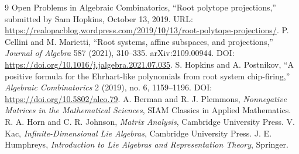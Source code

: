 \documentclass[11pt]{book}
\theoremstyle{definition}
\begin{document}
\backmatter
\begin{thebibliography}{9}
 Open Problems in Algebraic Combinatorics, ``Root polytope projections,'' submitted by Sam Hopkins, October 13, 2019. URL: \url{https://realopacblog.wordpress.com/2019/10/13/root-polytope-projections/}.
 P. Cellini and M. Marietti, ``Root systems, affine subspaces, and projections,'' \emph{Journal of Algebra} 587 (2021), 310--335. arXiv:2109.00944. DOI: \url{https://doi.org/10.1016/j.jalgebra.2021.07.035}.
 S. Hopkins and A. Postnikov, ``A positive formula for the Ehrhart-like polynomials from root system chip-firing,'' \emph{Algebraic Combinatorics} 2 (2019), no. 6, 1159--1196. DOI: \url{https://doi.org/10.5802/alco.79}.
 A. Berman and R. J. Plemmons, \emph{Nonnegative Matrices in the Mathematical Sciences}, SIAM Classics in Applied Mathematics.
 R. A. Horn and C. R. Johnson, \emph{Matrix Analysis}, Cambridge University Press.
 V. Kac, \emph{Infinite-Dimensional Lie Algebras}, Cambridge University Press.
 J. E. Humphreys, \emph{Introduction to Lie Algebras and Representation Theory}, Springer.
\end{thebibliography}
\end{document}
